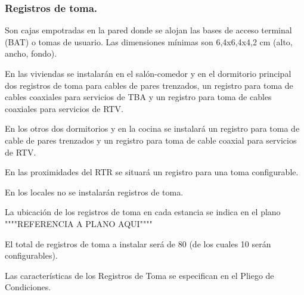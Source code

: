 \subsubsection{Registros de toma.}
Son cajas empotradas en la pared donde se alojan las bases de acceso terminal (BAT) o tomas de usuario. Las dimensiones mínimas son 6,4x6,4x4,2 cm (alto, ancho, fondo).

En las viviendas se instalarán en el salón-comedor y en el dormitorio principal dos registros de toma para cables de pares trenzados, un registro para toma de cables coaxiales para servicios de TBA y un registro para toma de cables coaxiales para servicios de RTV.

En los otros dos dormitorios y en la cocina se instalará un registro para toma de cable de pares trenzados y un registro para toma de cable coaxial para servicios de RTV.

En las proximidades del RTR se situará un registro para una toma configurable.

En los locales no se instalarán registros de toma.

La ubicación de los registros de toma en cada estancia se indica en el plano """"REFERENCIA A PLANO AQUI""""	

El total de registros de toma a instalar será de 80 (de los cuales 10 serán configurables).

Las características de los Registros de Toma se especifican en el Pliego de Condiciones.
